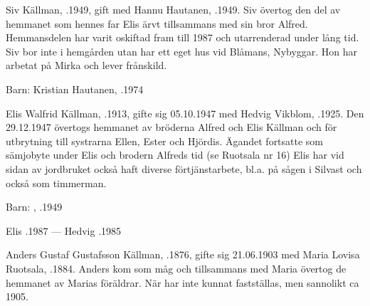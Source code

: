 %



%
Siv Källman, .1949, gift med Hannu Hautanen, .1949. Siv övertog den del av hemmanet som hennes far Elis ärvt tillsammans med sin bror Alfred. Hemmansdelen har varit oskiftad fram till 1987 och utarrenderad under lång tid. Siv bor inte i hemgården utan har ett eget hus vid Blåmans, Nybyggar. Hon har arbetat på Mirka och lever frånskild.

Barn: Kristian Hautanen, .1974


%
Elis Walfrid Källman, .1913, gifte sig 05.10.1947 med Hedvig Vikblom, .1925. Den 29.12.1947 övertogs hemmanet av bröderna Alfred och Elis Källman och för utbrytning till systrarna Ellen, Ester och Hjördis. Ägandet fortsatte som sämjobyte under Elis och brodern Alfreds tid (se Ruotsala nr 16) Elis har vid sidan av jordbruket också haft diverse förtjänstarbete, bl.a. på sågen i Silvast och också som timmerman.

Barn: , .1949

Elis .1987  ---  Hedvig .1985


%
Anders Gustaf Gustafsson Källman, .1876, gifte sig 21.06.1903 med Maria Lovisa Ruotsala, .1884. Anders kom som måg och tillsammans med Maria övertog de hemmanet av Marias föräldrar. När har inte kunnat fastställas, men sannolikt ca 1905.
\begin{jhchildren}
  \item {}
  \item {}
  \item {}
  \item {}
  \item {}
  \item {}
  \item {}
\end{jhchildren}

